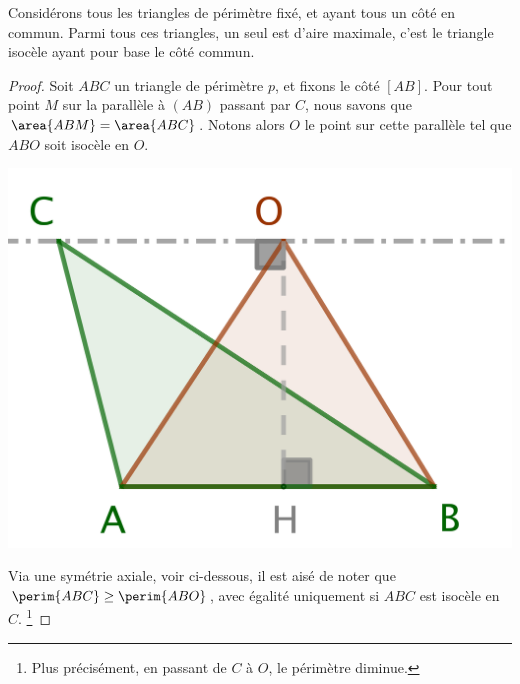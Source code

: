 \begin{fact} \label{tri-one-side-fixed}
	Considérons tous les triangles de périmètre fixé, et ayant tous un côté en commun.
	Parmi tous ces triangles, un seul est d'aire maximale, c'est le triangle isocèle ayant pour base le côté commun.
\end{fact}


\begin{proof}
	Soit $ABC$ un triangle de périmètre $p$, et fixons le côté $[AB]$. 
	Pour tout point $M$ sur la parallèle à $(AB)$ passant par $C$, nous savons que $\area{ABM} = \area{ABC}$. Notons alors $O$ le point sur cette parallèle tel que $ABO$ soit isocèle en $O$.

	\begin{center}
		\includegraphics[scale=.4]{content/triangle-one-side-fixed/triangle.png}
	\end{center}

	
	Via une symétrie axiale, voir ci-dessous, il est aisé de noter que $\perim{ABC} \geq \perim{ABO}$, avec égalité uniquement si $ABC$ est isocèle en $C$.%
	\footnote{
		Plus précisément, en passant de $C$ à $O$, le périmètre diminue.
	}
	

\end{proof}
